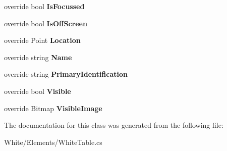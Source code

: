 \begin{DoxyCompactItemize}
\item 
\hypertarget{class_proto_test_1_1_golem_1_1_white_1_1_elements_1_1_white_table_a1a241e6fe3d487dee7a4c91e32b81010}{override bool {\bfseries Is\-Focussed}}\label{class_proto_test_1_1_golem_1_1_white_1_1_elements_1_1_white_table_a1a241e6fe3d487dee7a4c91e32b81010}

\item 
\hypertarget{class_proto_test_1_1_golem_1_1_white_1_1_elements_1_1_white_table_ae9365bc3041047806270e52c2a580d72}{override bool {\bfseries Is\-Off\-Screen}}\label{class_proto_test_1_1_golem_1_1_white_1_1_elements_1_1_white_table_ae9365bc3041047806270e52c2a580d72}

\item 
\hypertarget{class_proto_test_1_1_golem_1_1_white_1_1_elements_1_1_white_table_a28740c73db9a67799be0d59f5aa71f03}{override Point {\bfseries Location}}\label{class_proto_test_1_1_golem_1_1_white_1_1_elements_1_1_white_table_a28740c73db9a67799be0d59f5aa71f03}

\item 
\hypertarget{class_proto_test_1_1_golem_1_1_white_1_1_elements_1_1_white_table_a115522d050edf8f0482d81e8b1952361}{override string {\bfseries Name}}\label{class_proto_test_1_1_golem_1_1_white_1_1_elements_1_1_white_table_a115522d050edf8f0482d81e8b1952361}

\item 
\hypertarget{class_proto_test_1_1_golem_1_1_white_1_1_elements_1_1_white_table_a9b833b766ecb2cee69f6c427b3d4135e}{override string {\bfseries Primary\-Identification}}\label{class_proto_test_1_1_golem_1_1_white_1_1_elements_1_1_white_table_a9b833b766ecb2cee69f6c427b3d4135e}

\item 
\hypertarget{class_proto_test_1_1_golem_1_1_white_1_1_elements_1_1_white_table_af62eb5e7306abd5ddf596eceb7900d68}{override bool {\bfseries Visible}}\label{class_proto_test_1_1_golem_1_1_white_1_1_elements_1_1_white_table_af62eb5e7306abd5ddf596eceb7900d68}

\item 
\hypertarget{class_proto_test_1_1_golem_1_1_white_1_1_elements_1_1_white_table_a154cf94a7aa18387d261e96e28e7e5e0}{override Bitmap {\bfseries Visible\-Image}}\label{class_proto_test_1_1_golem_1_1_white_1_1_elements_1_1_white_table_a154cf94a7aa18387d261e96e28e7e5e0}

\end{DoxyCompactItemize}


The documentation for this class was generated from the following file\-:\begin{DoxyCompactItemize}
\item 
White/\-Elements/White\-Table.\-cs\end{DoxyCompactItemize}
